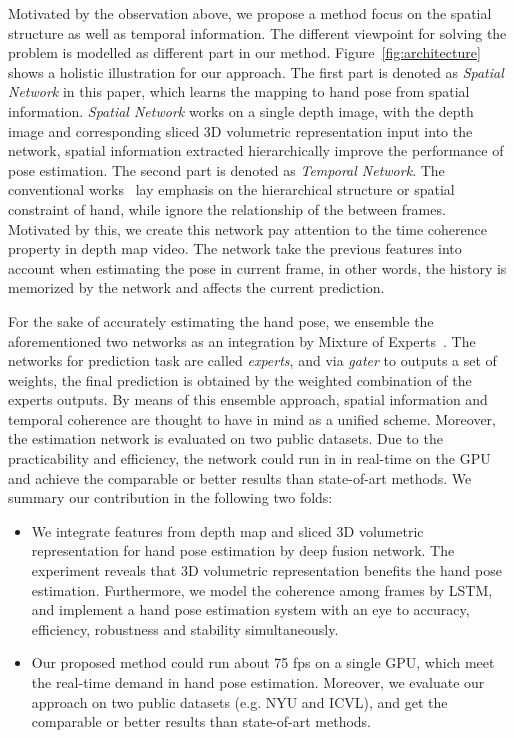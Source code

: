 \documentclass[journal,comsoc]{IEEEtran}
\begin{document}
Motivated by the observation above, we propose a method focus on the spatial structure as well as
temporal information. The different viewpoint for solving the problem is modelled as different part in
our method. Figure~\ref{fig:architecture} shows a holistic illustration for our approach. The first
part is denoted as \emph{Spatial Network} in this paper, which learns the mapping to hand pose from
spatial information. \emph{Spatial Network} works on a single depth image, with the depth image and
corresponding sliced 3D volumetric representation input into the network, spatial information extracted
hierarchically improve the performance of pose estimation. The second part is denoted as \emph{Temporal Network}.
The conventional works~\cite{tang2014latent, zhou2016model, tang2015opening} lay emphasis on the
hierarchical structure or spatial constraint of hand, while ignore the relationship
of the between frames. Motivated by this, we create this network pay attention to the time coherence property
in depth map video. The network take the previous features into account when estimating the pose in current frame,
in other words, the history is memorized by the network and affects the current prediction.

For the sake of accurately estimating the hand pose, we ensemble the aforementioned two networks as an
integration by Mixture of Experts~\cite{jacobs1991adaptive}. The networks for prediction task are called
\emph{experts}, and via \emph{gater} to outputs a set of weights, the final prediction is obtained by the
weighted combination of the experts outputs. By means of this ensemble approach, spatial information and temporal
coherence are thought to have in mind as a unified scheme. Moreover, the estimation network is evaluated on
two public datasets. Due to the practicability and efficiency, the network could run in in real-time on the GPU and achieve
the comparable or better results than state-of-art methods. We summary our contribution in the following two folds:
\begin{itemize}
  \item
  We integrate features from depth map and sliced 3D volumetric representation for hand pose
  estimation by deep fusion network. The experiment reveals that 3D volumetric representation
  benefits the hand pose estimation. Furthermore, we model the coherence among frames by LSTM,
  and implement a hand pose estimation system with an eye to accuracy, efficiency, robustness
  and stability simultaneously.
  \item
  Our proposed method could run about 75 fps on a single GPU, which meet the real-time demand
  in hand pose estimation. Moreover, we evaluate our approach on two public datasets (e.g. NYU
  and ICVL), and get the comparable or better results than state-of-art methods.
\end{itemize}
\end{document}
